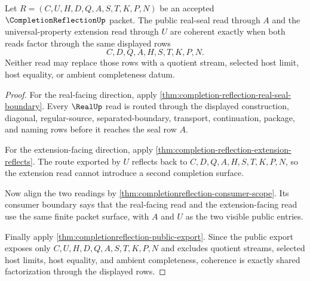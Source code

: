 \begin{theorem}
\label{thm:completionreflection-real-seal-extension-coherence}
Let $R=(C,U,H,D,Q,A,S,T,K,P,N)$ be an accepted $\CompletionReflectionUp$ packet. The public real-seal read through $A$ and the universal-property extension read through $U$ are coherent exactly when both reads factor through the same displayed rows
$$
C,D,Q,A,H,S,T,K,P,N.
$$
Neither read may replace those rows with a quotient stream, selected host limit, host equality, or ambient completeness datum.
\end{theorem}
\begin{proof}
For the real-facing direction, apply \autoref{thm:completion-reflection-real-seal-boundary}. Every $\RealUp$ read is routed through the displayed construction, diagonal, regular-source, separated-boundary, transport, continuation, package, and naming rows before it reaches the seal row $A$.

For the extension-facing direction, apply \autoref{thm:completion-reflection-extension-reflects}. The route exported by $U$ reflects back to $C,D,Q,A,H,S,T,K,P,N$, so the extension read cannot introduce a second completion surface.

Now align the two readings by \autoref{thm:completionreflection-consumer-scope}. Its consumer boundary says that the real-facing read and the extension-facing read use the same finite packet surface, with $A$ and $U$ as the two visible public entries.

Finally apply \autoref{thm:completionreflection-public-export}. Since the public export exposes only $C,U,H,D,Q,A,S,T,K,P,N$ and excludes quotient streams, selected host limits, host equality, and ambient completeness, coherence is exactly shared factorization through the displayed rows.
\end{proof}

